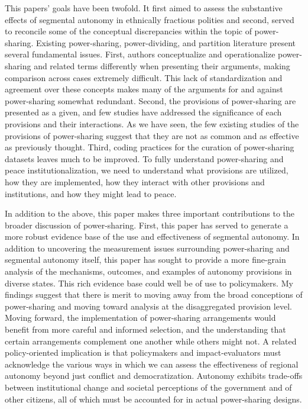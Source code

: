 \documentclass[12pt]{article}
\begin{document}
This papers' goals have been twofold. It first aimed to assess the substantive effects of segmental autonomy in ethnically fractious polities and second, served to reconcile some of the conceptual discrepancies within the topic of power-sharing. Existing power-sharing, power-dividing, and partition literature present several fundamental issues. First, authors conceptualize and operationalize power-sharing and related terms differently when presenting their arguments, making comparison across cases extremely difficult. This lack of standardization and agreement over these concepts makes many of the arguments for and against power-sharing somewhat redundant. Second, the provisions of power-sharing are presented as a given, and few studies have addressed the significance of each provisions and their interactions. As we have seen, the few existing studies of the provisions of power-sharing suggest that they are not as common and as effective as previously thought. Third, coding practices for the curation of power-sharing datasets leaves much to be improved. To fully understand power-sharing and peace institutionalization, we need to understand what provisions are utilized, how they are implemented, how they interact with other provisions and institutions, and how they might lead to peace.

In addition to the above, this paper makes three important contributions to the broader discussion of power-sharing. First, this paper has served to generate a more robust evidence base of the use and effectiveness of segmental autonomy. In addition to uncovering the measurement issues surrounding power-sharing and segmental autonomy itself, this paper has sought to provide a more fine-grain analysis of the mechanisms, outcomes, and examples of autonomy provisions in diverse states. This rich evidence base could well be of use to policymakers. My findings suggest that there is merit to moving away from the broad conceptions of power-sharing and moving toward analysis at the disaggregated provision level. Moving forward, the implementation of power-sharing arrangements would benefit from more careful and informed selection, and the understanding that certain arrangements complement one another while others might not. A related policy-oriented implication is that policymakers and impact-evaluators must acknowledge the various ways in which we can assess the effectiveness of regional autonomy beyond just conflict and democratization. Autonomy exhibits trade-offs between institutional change and societal perceptions of the government and of other citizens, all of which must be accounted for in actual power-sharing designs.
\end{document}

